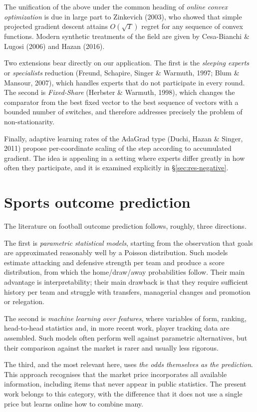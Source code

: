 \documentclass[12pt,a4paper,oneside]{report}
\renewcommand{\_}{\oldunderscore\allowbreak}
\theoremstyle{definition}
\theoremstyle{plain}
\theoremstyle{remark}
\begin{document}
The unification of the above under the common heading of \emph{online convex optimization} is
due in large part to Zinkevich (2003), who showed that simple projected gradient descent
attains $O(\sqrt{T})$ regret for any sequence of convex functions. Modern synthetic treatments
of the field are given by Cesa-Bianchi \& Lugosi (2006) and Hazan (2016).

Two extensions bear directly on our application. The first is the \emph{sleeping experts} or
\emph{specialists} reduction (Freund, Schapire, Singer \& Warmuth, 1997; Blum \& Mansour,
2007), which handles experts that do not participate in every round. The second is
\emph{Fixed-Share} (Herbster \& Warmuth, 1998), which changes the comparator from the best
fixed vector to the best sequence of vectors with a bounded number of switches, and therefore
addresses precisely the problem of non-stationarity.

Finally, adaptive learning rates of the AdaGrad type (Duchi, Hazan \& Singer, 2011) propose
per-coordinate scaling of the step according to accumulated gradient. The idea is appealing in
a setting where experts differ greatly in how often they participate, and it is examined
explicitly in \S\ref{sec:res-negative}.

\section{Sports outcome prediction}

The literature on football outcome prediction follows, roughly, three directions.

The first is \emph{parametric statistical models}, starting from the observation that goals
are approximated reasonably well by a Poisson distribution. Such models estimate attacking and
defensive strength per team and produce a score distribution, from which the home/draw/away
probabilities follow. Their main advantage is interpretability; their main drawback is that
they require sufficient history per team and struggle with transfers, managerial changes and
promotion or relegation.

The second is \emph{machine learning over features}, where variables of form, ranking,
head-to-head statistics and, in more recent work, player tracking data are assembled. Such
models often perform well against parametric alternatives, but their comparison against the
market is rarer and usually less rigorous.

The third, and the most relevant here, uses \emph{the odds themselves as the prediction}. This
approach recognises that the market price incorporates all available information, including
items that never appear in public statistics. The present work belongs to this category, with
the difference that it does not use a single price but learns online how to combine many.
\end{document}
